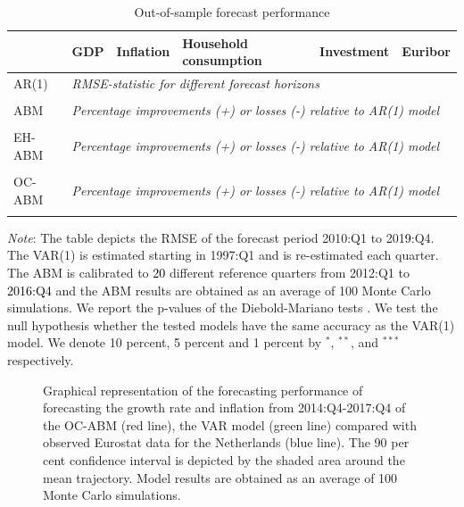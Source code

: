 \begin{table}[!h]
	\caption{Out-of-sample forecast performance} 
	\label{table:rmse_abm}
	\centering
    
		\begin{tabular}{llllll}
			\toprule
			& GDP & Inflation & Household consumption & Investment & Euribor \\
			\midrule
			AR(1) & \multicolumn{5}{l}{\textit{RMSE-statistic for different forecast horizons}} \\  \midrule
			 
               \\ \midrule
   			ABM & \multicolumn{5}{l}{\textit{Percentage improvements (+) or losses (-) relative to AR(1) model}} \\  \midrule
			
               \\ \midrule
            EH-ABM & \multicolumn{5}{l}{\textit{Percentage improvements (+) or losses (-) relative to AR(1) model}} \\  \midrule
			
               \\ \midrule

			OC-ABM & \multicolumn{5}{l}{\textit{Percentage improvements (+) or losses (-) relative to AR(1) model}} \\  \midrule
			
			\\ \bottomrule
		\end{tabular}
	\begin{tablenotes}
		\footnotesize \item \textit{Note}: The table depicts the RMSE of the forecast period 2010:Q1 to 201\textcolor{black}{9}:Q4. The VAR(1) is estimated starting in 1997:Q1 and is re-estimated each quarter. The ABM is calibrated to \textcolor{black}{20} different reference quarters from 2012:Q1 to \textcolor{black}{2016:Q4} and the ABM results are obtained as an average of 100 Monte Carlo simulations. We report the p-values of the Diebold-Mariano tests \citep{harveyTestingEqualityPrediction1997}.  We test the null hypothesis whether the tested models have the same accuracy as the VAR(1) model. We denote  10 percent, 5 percent and 1 percent by $^{*}$, $^{**}$, and $^{***}$ respectively.
	\end{tablenotes}
\end{table}


\begin{figure}[!h]
	\centering

 \caption{ Graphical representation of the forecasting performance of forecasting the growth rate and inflation from 2014:Q4-2017:Q4 of the OC-ABM (red line), the VAR model (green line) compared with observed Eurostat data for the Netherlands (blue line). The 90 per cent confidence interval is depicted by the shaded area around the mean trajectory. Model results are obtained as an average of 100 Monte Carlo simulations.}
   \label{fig:gvamacro_growthinflation_yq}
\end{figure}

